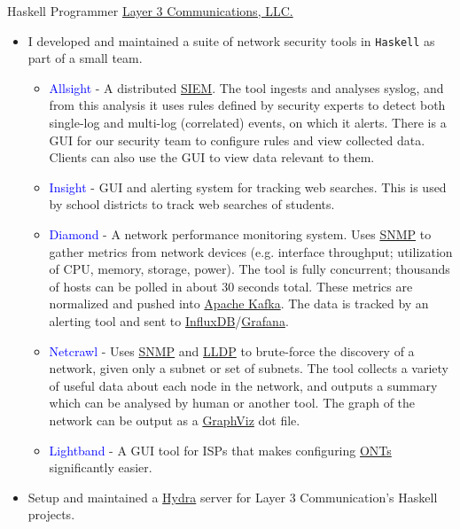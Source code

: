 \documentclass[10pt,letterpaper,sans]{moderncv}
\newcommand{\wlink}[2]{\textcolor[HTML]{461645}{\href{#1}{#2}}}
\newcommand{\lang}[1]{\texttt{#1}}
\begin{document}
  {Haskell Programmer}
  {\wlink{https://layer3com.com}{Layer 3 Communications, LLC.}}
  {}
  {}
  {
\begin{itemize}
  \item I developed and maintained a suite of network security tools in \lang{Haskell} as part of a small team.
  \begin{itemize}
    \item \textcolor{blue}{Allsight} - A distributed \wlink{https://en.wikipedia.org/wiki/Security_information_and_event_management}{SIEM}. The tool ingests and analyses syslog, and from this analysis it uses rules defined by security experts to detect both single-log and multi-log (correlated) events, on which it alerts. There is a GUI for our security team to configure rules and view collected data. Clients can also use the GUI to view data relevant to them.
    \item \textcolor{blue}{Insight} - GUI and alerting system for tracking web searches. This is used by school districts to track web searches of students.
    \item \textcolor{blue}{Diamond} - A network performance monitoring system. Uses \wlink{https://en.wikipedia.org/wiki/Simple_Network_Management_Protocol}{SNMP} to gather metrics from network devices (e.g. interface throughput; utilization of CPU, memory, storage, power). The tool is fully concurrent; thousands of hosts can be polled in about 30 seconds total. These metrics are normalized and pushed into \wlink{https://kafka.apache.org/}{Apache Kafka}. The data is tracked by an alerting tool and sent to \wlink{https://www.influxdata.com/}{InfluxDB}/\wlink{https://grafana.com/}{Grafana}.
    \item \textcolor{blue}{Netcrawl} - Uses \wlink{https://en.wikipedia.org/wiki/Simple_Network_Management_Protocol}{SNMP} and \wlink{https://en.wikipedia.org/wiki/Link_Layer_Discovery_Protocol}{LLDP} to brute-force the discovery of a network, given only a subnet or set of subnets. The tool collects a variety of useful data about each node in the network, and outputs a summary which can be analysed by human or another tool. The graph of the network can be output as a \wlink{http://www.graphviz.org/}{GraphViz} dot file.
    \item \textcolor{blue}{Lightband} - A GUI tool for ISPs that makes configuring \wlink{https://en.wikipedia.org/wiki/Network_interface_device\#Optical_network_terminals}{ONTs} significantly easier.
  \end{itemize}
  \item Setup and maintained a \wlink{https://nixos.org/hydra/}{Hydra} server for Layer 3 Communication's Haskell projects.
\end{itemize}
}
\end{document}
